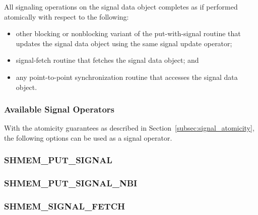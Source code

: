 \documentclass[10pt]{book}
\begin{document}
All signaling operations on the signal data object completes as if performed
atomically with respect to the following:
\begin{itemize}
    \item other blocking or nonblocking variant of the put-with-signal routine
    that updates the signal data object using the same signal update operator;
    \item signal-fetch routine that fetches the signal data object; and
    \item any point-to-point synchronization routine that accesses the signal
    data object.
\end{itemize}

\subsubsection{Available Signal Operators}
\label{subsec:signal_operator}

With the atomicity guarantees as described in
Section~\ref{subsec:signal_atomicity}, the following options can be used as a
signal operator.




\subsubsection{\textbf{SHMEM\_PUT\_SIGNAL}}\label{subsec:shmem_put_signal}


\subsubsection{\textbf{SHMEM\_PUT\_SIGNAL\_NBI}}\label{subsec:shmem_put_signal_nbi}


\subsubsection{\textbf{SHMEM\_SIGNAL\_FETCH}}\label{subsec:shmem_signal_fetch}

\end{document}
